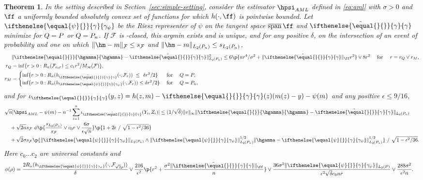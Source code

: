 \documentclass[aos,submission]{imsart}
\theoremstyle{plain}
\newtheorem{theo}[prop]{Theorem}
\theoremstyle{remark}
\DeclareMathOperator*{\cspan}{\overline{span}}
\newcommand{\influence}{\iota}
\newcommand{\riesz}[1][]{\ifthenelse{\equal{#1}{}}{\gamma}{\gamma_{{#1}}}}
\newcommand{\hriesz}[1][]{\ifthenelse{\equal{#1}{}}{\hgamma}{\hgamma_{{#1}}}}
\DeclarePairedDelimiter\abs{\lvert}{\rvert}
\DeclarePairedDelimiter\norm{\lVert}{\rVert}
\DeclarePairedDelimiter\set{\{}{\}}
\newcommand{\F}{\mathcal{F}}
\begin{document}
\begin{theo}
\label{theo:simple-rate}
In the setting described in Section~\ref{sec:simple-setting}, 
consider the estimator $\hpsi_{AML}$ defined in \eqref{eq:aml} with $\sigma > 0$ and $\ff$ 
a uniformly bounded absolutely convex set of functions for which $h(\cdot,\ff)$ is pointwise bounded.
Let $\riesz[\psi]$ be the Riesz representer of $\psi$ on the tangent space $\cspan \ff$ and 
$\tilde \riesz$ minimize \smash{$\norm{\riesz[\psi] - \riesz}_{L_2(Q)}^2 + (\sigma^2/n)\norm{\riesz}_{\F}^2\ $} for $Q=\P$ or $Q=\Pn$.
If $\F$ is -closed,
this argmin exists and is unique, and for any positive $\delta$, on the intersection of an event of probability \smash{$1-4\delta-3\exp(-c_2nr_Q^2/M_{\infty}^2(\F))$}
and one on which $\norm{\hm - m}_{\F} \le s_{\F}$ and $\norm{\hm - m}_{L_2(\Pn)} \le s_{L_2(\Pn)}$,
\begin{equation}
\label{eq:sample-riesz-rate} 
\begin{aligned}
&\norm{\hriesz - \tilde\riesz}_{L_2(\Pn)}^2 
\le 6\p{nr^4/\sigma^2 + \norm{\tilde\riesz}_{\ff}r^2} \vee 8 r^2 \quad \text{ for } \quad  r = r_Q \vee r_M, \\
r_Q &= \inf\set{r > 0 : R_n(\F_{c_0r}) \le c_1 r^2/M_{\infty}(\F)},\\
r_M &= \begin{cases} \inf\set{ r > 0 : R_n(h_{\tilde\riesz}(\cdot,\F_r))  \ \le \ \delta r^2/2} & \text{ for } \quad Q=\P,  \\
  		     \inf\set{ r > 0 : R_n(h_{\riesz[\psi]}(\cdot,\F_r)) \le \delta r^2/2} & \text{ for } \quad Q=\Pn, \end{cases}  \\
\end{aligned}
\end{equation}
and for $\influence_{\riesz}(y,z) = h(z,m) - \riesz(z)(m(z) - y) - \psi(m)$
and any positive $\epsilon \le 9/16$,
\begin{equation}
\label{eq:remainder-rate} 
\begin{aligned}
&\sqrt{n}\abs{\hpsi_{AML} - \psi(m) - n^{-1}\sum_{i=1}^n \influence_{\tilde\riesz}(Y_i,Z_i)} 
\le (1/\sqrt{\delta}) \norm{v}_{\infty} \norm{\hriesz - \tilde\riesz}_{L_2(\Pn)} \\ 
&\quad +  \sqrt{2n}s_{\F}\ \phi\p{\frac{s_{L_2(\Pn)}}{s_{\F}} \vee c_0 r \vee \frac{6 \sigma}{\epsilon \sqrt{n}}} \p{1+2\epsilon\ /\ \sqrt{1-\epsilon^2/36}}\\
&\quad +  \sqrt{2}\sigma s_{\F} \p{\norm{\riesz[\psi]}_{L_2(\Pn)} \wedge \norm{\riesz[\psi]}_{L_2(\Pn)}^{1/2} \norm{\hgamma-\riesz[\psi]}_{L_2(\Pn)}^{1/2}}\ /\ \sqrt{1-\epsilon^2/36}. 
\end{aligned}
\end{equation}
Here $c_0 \ldots c_2$ are universal constants and 
\begin{align*} 
\phi(\rho) &= \frac{2R_n(h_{\riesz[\psi]}(\cdot, \F_{\sqrt{2}\rho}))}{\delta} 
	   \vee \frac{216}{\epsilon^2}\p{r^2 + \frac{\sigma^2 \norm{\tilde\riesz}_{\ff}}{n}}
	   \vee \frac{ 36\sigma^2 \norm{\riesz[\psi]}_{L_2(\P)}}{\epsilon^2\sqrt{\delta} c_0 n r} \vee \frac{288\sigma^2}{\epsilon^2 n}.
\end{align*}
\end{theo}
\end{document}

